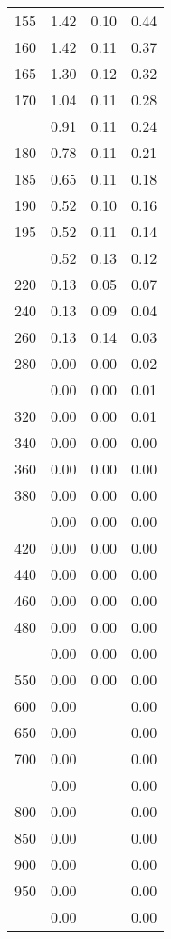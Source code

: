 \begin{table}[ht]
\begin{tabular}{lccc}
  155 & 1.42 & 0.10 & 0.44 \\ 
  160 & 1.42 & 0.11 & 0.37 \\ 
  165 & 1.30 & 0.12 & 0.32 \\ 
  170 & 1.04 & 0.11 & 0.28 \\ 
   \addlinespace
175 & 0.91 & 0.11 & 0.24 \\ 
  180 & 0.78 & 0.11 & 0.21 \\ 
  185 & 0.65 & 0.11 & 0.18 \\ 
  190 & 0.52 & 0.10 & 0.16 \\ 
  195 & 0.52 & 0.11 & 0.14 \\ 
   \addlinespace
200 & 0.52 & 0.13 & 0.12 \\ 
  220 & 0.13 & 0.05 & 0.07 \\ 
  240 & 0.13 & 0.09 & 0.04 \\ 
  260 & 0.13 & 0.14 & 0.03 \\ 
  280 & 0.00 & 0.00 & 0.02 \\ 
   \addlinespace
300 & 0.00 & 0.00 & 0.01 \\ 
  320 & 0.00 & 0.00 & 0.01 \\ 
  340 & 0.00 & 0.00 & 0.00 \\ 
  360 & 0.00 & 0.00 & 0.00 \\ 
  380 & 0.00 & 0.00 & 0.00 \\ 
   \addlinespace
400 & 0.00 & 0.00 & 0.00 \\ 
  420 & 0.00 & 0.00 & 0.00 \\ 
  440 & 0.00 & 0.00 & 0.00 \\ 
  460 & 0.00 & 0.00 & 0.00 \\ 
  480 & 0.00 & 0.00 & 0.00 \\ 
   \addlinespace
500 & 0.00 & 0.00 & 0.00 \\ 
  550 & 0.00 & 0.00 & 0.00 \\ 
  600 & 0.00 &  & 0.00 \\ 
  650 & 0.00 &  & 0.00 \\ 
  700 & 0.00 &  & 0.00 \\ 
   \addlinespace
750 & 0.00 &  & 0.00 \\ 
  800 & 0.00 &  & 0.00 \\ 
  850 & 0.00 &  & 0.00 \\ 
  900 & 0.00 &  & 0.00 \\ 
  950 & 0.00 &  & 0.00 \\ 
   \addlinespace
1000 & 0.00 &  & 0.00 \\ 
   \bottomrule
\end{tabular}
\end{table}
